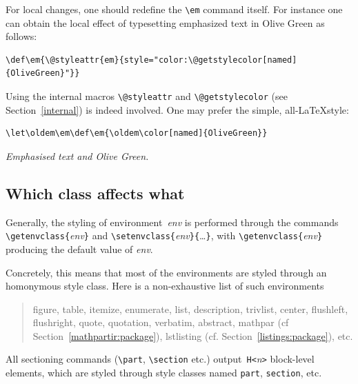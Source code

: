 %
For local changes, one should redefine the \verb+\em+ command itself. For instance one can obtain the local effect of typesetting emphasized text in Olive Green
as follows:
\begin{verbatim}
\def\em{\@styleattr{em}{style="color:\@getstylecolor[named]{OliveGreen}"}}
\end{verbatim}
Using the internal macros \verb+\@styleattr+ and \verb+\@getstylecolor+
(see Section~\ref{internal}) is indeed involved.
One may prefer the simple, all-\LaTeX style:
\begin{verbatim}
\let\oldem\em\def\em{\oldem\color[named]{OliveGreen}}
\end{verbatim}
\begin{htmlonly}
\begin{htmlout}
\let\oldem\em\def\em{\oldem\color[named]{OliveGreen}}%
\em Emphasised text and Olive Green.
\end{htmlout}
\end{htmlonly}

\subsection{Which class affects\label{whatclass} what}

Generally, the styling of environment~\textit{env} is performed through
the commands
\verb+\getenvclass{+\textit{env}\verb+}+
and \verb+\setenvclass{+\textit{env}\verb+}{+\ldots\verb+}+,
with \verb+\getenvclass{+\textit{env}\verb+}+ producing the
default value of \textit{env}.

Concretely, this means that most of the environments are styled through
an homonymous style class. Here is a non-exhaustive list of such
environments
\begin{quote}
figure, table, itemize, enumerate, list, description, 
trivlist, center, flushleft, flushright, quote,
quotation, verbatim, abstract, mathpar (cf
Section~\ref{mathpartir:package}), lstlisting
(cf. Section~\ref{listings:package}), etc.
\end{quote}

All sectioning commands (\verb+\part+, \verb+\section+ etc.)
output~\verb+H<+\textit{n}\verb+>+ block-level  elements, which are styled
through style classes named \texttt{part}, \texttt{section}, etc.


